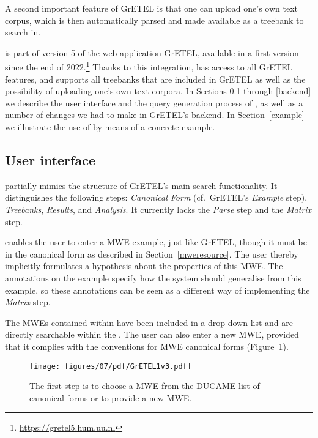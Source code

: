 \documentclass[output=paper,colorlinks,citecolor=brown]{langscibook}
\begin{document}
A second important feature of GrETEL is that one can upload one's own text corpus, which is then automatically parsed and made available as a treebank to search in. 



{\mwefinder} is part of version 5 of the web application GrETEL, available in a first version since the end of 2022.\footnote{\url{https://gretel5.hum.uu.nl}} Thanks to this integration, {\mwefinder} has access to all GrETEL features, and supports all treebanks that are included in GrETEL as well as the possibility of uploading one's own text corpora. In Sections \ref{frontend} through \ref{backend} we describe the user interface and the query generation process of {\mwefinder}, as well as a number of changes we had to make in GrETEL's backend. In Section~\ref{example} we illustrate the use of {\mwefinder} by means of a concrete example.


\subsection{User interface}
\label{frontend}
{\mwefinder} partially mimics the structure of GrETEL's main search functionality. It distinguishes the following steps: \textit{Canonical Form} (cf.\ GrETEL's \textit{Example} step), \textit{Treebanks}, \textit{Results}, and \textit{Analysis}. It currently lacks the \textit{Parse} step and the \textit{Matrix} step.
 
 
 {\mwefinder}  enables the user to enter a MWE example, just like GrETEL, though it must be in the canonical form as described in Section~\ref{mweresource}. The user thereby implicitly formulates a hypothesis about the properties of this MWE. The annotations on the example specify how the system should generalise from this example, so these annotations can be seen as a different way of implementing the \textit{Matrix} step.
 
The MWEs contained within {\DUCAME} have been included in a drop-down list  and are directly searchable within the {\mwefinder}. The user can also enter a new MWE, provided that it complies with the conventions for MWE canonical forms (Figure~\ref{fig:canonical}).

\begin{figure}[p]
\caption{The first step is to choose a MWE from the DUCAME list of canonical forms or to provide a new MWE.}
\label{fig:canonical}
\texttt{[image: figures/07/pdf/GrETEL1v3.pdf]}
\end{figure}
\end{document}
